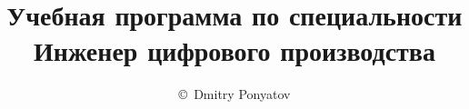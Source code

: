 
\author{\copyright\ Dmitry Ponyatov }
\title{Учебная программа по специальности\\\Huge{Инженер цифрового
производства}}

\maketitle
\tableofcontents


